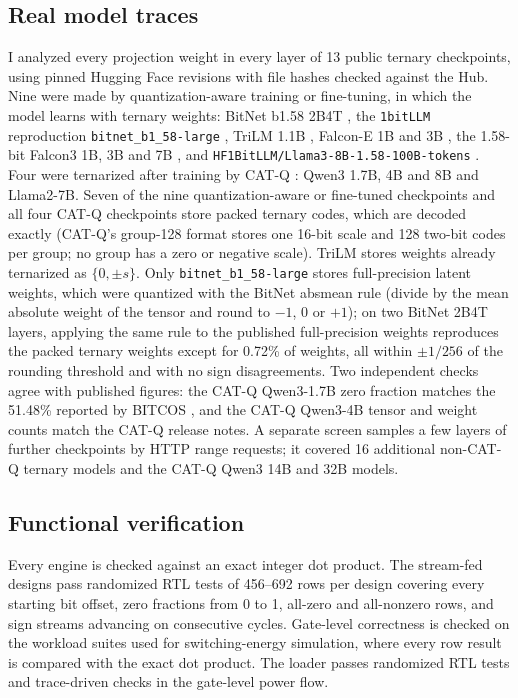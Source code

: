 \documentclass[11pt]{article}
\begin{document}
\subsection{Real model traces}

I analyzed every projection weight in every layer of 13 public ternary checkpoints, using pinned Hugging Face revisions with file hashes checked against the Hub. Nine were made by quantization-aware training or fine-tuning, in which the model learns with ternary weights: BitNet b1.58 2B4T \cite{ma2025bitnet2b4t}, the \texttt{1bitLLM} reproduction \texttt{bitnet\_b1\_58-large} \cite{ma2024era}, TriLM 1.1B \cite{kaushal2024spectra}, Falcon-E 1B and 3B \cite{falcone2025}, the 1.58-bit Falcon3 1B, 3B and 7B \cite{falcon3blog2024}, and \texttt{HF1BitLLM/Llama3-8B-1.58-100B-tokens} \cite{mekkouri2024finetuning}. Four were ternarized after training by CAT-Q \cite{wang2026catq}: Qwen3 1.7B, 4B and 8B and Llama2-7B. Seven of the nine quantization-aware or fine-tuned checkpoints and all four CAT-Q checkpoints store packed ternary codes, which are decoded exactly (CAT-Q's group-128 format stores one 16-bit scale and 128 two-bit codes per group; no group has a zero or negative scale). TriLM stores weights already ternarized as $\{0,\pm s\}$. Only \texttt{bitnet\_b1\_58-large} stores full-precision latent weights, which were quantized with the BitNet absmean rule (divide by the mean absolute weight of the tensor and round to $-1$, $0$ or $+1$); on two BitNet 2B4T layers, applying the same rule to the published full-precision weights reproduces the packed ternary weights except for 0.72\% of weights, all within $\pm 1/256$ of the rounding threshold and with no sign disagreements. Two independent checks agree with published figures: the CAT-Q Qwen3-1.7B zero fraction matches the 51.48\% reported by BITCOS \cite{georganas2026bitcos}, and the CAT-Q Qwen3-4B tensor and weight counts match the CAT-Q release notes. A separate screen samples a few layers of further checkpoints by HTTP range requests; it covered 16 additional non-CAT-Q ternary models and the CAT-Q Qwen3 14B and 32B models.

\subsection{Functional verification}

Every engine is checked against an exact integer dot product. The stream-fed designs pass randomized RTL tests of 456--692 rows per design covering every starting bit offset, zero fractions from 0 to 1, all-zero and all-nonzero rows, and sign streams advancing on consecutive cycles. Gate-level correctness is checked on the workload suites used for switching-energy simulation, where every row result is compared with the exact dot product. The loader passes randomized RTL tests and trace-driven checks in the gate-level power flow.
\end{document}
